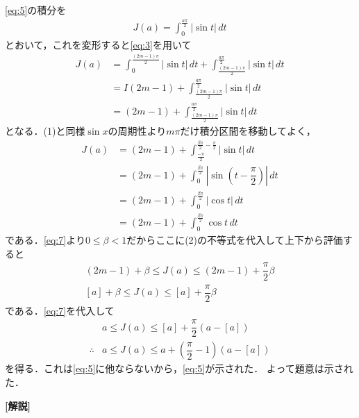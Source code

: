 \documentclass[../../main.tex]{subfiles}
\begin{document}
\cref{eq:5}の積分を
\begin{align}
  J(a)= \int_0^{\frac{a\pi}{2}}|\sin t|\,dt
\end{align}
とおいて，これを変形すると\cref{eq:3}を用いて
\begin{align}
  J(a)
  &=\int_0^{\frac{(2m-1)\pi}{2}}|\sin t|\,dt+\int_{\frac{(2m-1)\pi}{2}}^{\frac{a\pi}{2}}|\sin t|\,dt\\
  &=I(2m-1) + \int_{\frac{(2m-1)\pi}{2}}^{\frac{a\pi}{2}}|\sin t|\,dt\\
  &=(2m-1) + \int_{\frac{(2m-1)\pi}{2}}^{\frac{a\pi}{2}}|\sin t|\,dt
\end{align}
となる．(1)と同様$\sin x$の周期性より$m\pi$だけ積分区間を移動してよく，
\begin{align}
  J(a)
  &=(2m-1) + \int_{\frac{-\pi}{2}}^{\frac{\beta \pi}{2}-\frac{\pi}{2}}|\sin t|\,dt \\
  &=(2m-1) + \int_{0}^{\frac{\beta \pi}{2}}\left|\sin \left( t - \dfrac{\pi}{2}\right)\right|\,dt  \\
  &=(2m-1) + \int_{0}^{\frac{\beta \pi}{2}}\left|\cos t \right|\,dt \\
  &=(2m-1) + \int_{0}^{\frac{\beta \pi}{2}}\cos t \,dt
\end{align}
である．\cref{eq:7}より$0 \le \beta < 1$だからここに(2)の不等式を代入して上下から評価すると
\begin{align}
  (2m-1) + \beta \le J(a) \le (2m-1) + \dfrac{\pi}{2} \beta \\{}
  [a] + \beta \le J(a) \le [a] + \dfrac{\pi}{2} \beta
\end{align}
である．\cref{eq:7}を代入して
\begin{align}
  & a \le J(a) \le [a] + \dfrac{\pi}{2} \left(a-[a]\right) \\
  \therefore
  & a \le J(a) \le a + \left(\dfrac{\pi}{2}-1\right) \left(a-[a]\right) \label{eq:8}
\end{align}
を得る．これは\cref{eq:5}に他ならないから，\cref{eq:5}が示された．
よって題意は示された．

{\bf [解説]}
\end{document}
